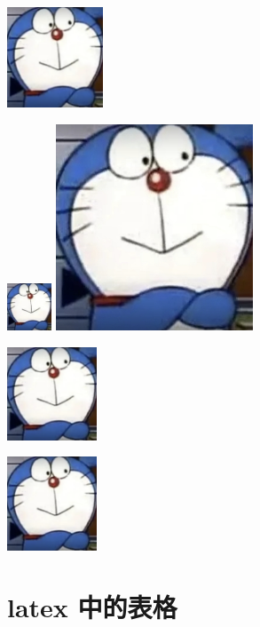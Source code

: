 \documentclass[8pt]{article}
\begin{document}
	\includegraphics[height=3cm]{123.png}
	
	\includegraphics[width=0.1\textwidth]{123.png}
	\includegraphics[height=0.1\textheight]{123.png}
	
	
	\includegraphics[angle=-90, width=0.2\textwidth]{123.png}
	
	\includegraphics[angle=-90, width=0.2\textwidth]{123.png}
	
	\section{latex 中的表格}
	
\end{document}
